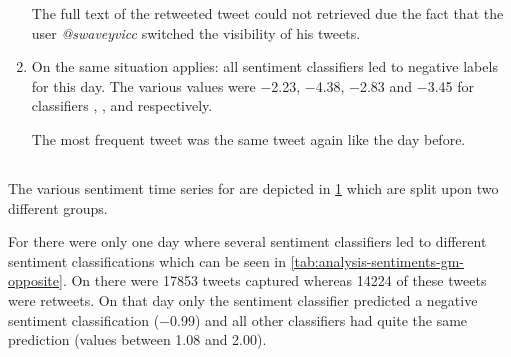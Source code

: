 \begin{enumerate}
        The full text of the retweeted tweet could not retrieved due the fact that the user \emph{@swaveyvicc} switched the visibility of his tweets.

    \item 
        On  the same situation applies: all sentiment classifiers led to negative labels for this day.
        The various values were \num{-2.23}, \num{-4.38}, \num{-2.83} and \num{-3.45} for classifiers \ftb{}, \fnb{}, \fme{} and \fsvm{} respectively.


        The most frequent tweet was the same tweet again like the day before.
\end{enumerate}


\subsection{\gm}
\label{ss:analysis-sentiments-gm}

The various sentiment time series for \gm{} are depicted in \cref{fig:analysis-sentiments-gm} which are split upon two different groups.

\begin{figure}[hbt]
    \centering
    
    \caption{\sentimentsCaption{\gm}}
    \label{fig:analysis-sentiments-gm}
\end{figure}


For \gm{} there were only one day where several sentiment classifiers led to different sentiment classifications which can be seen in \cref{tab:analysis-sentiments-gm-opposite}.
On  there were \num{17853} tweets captured whereas \num{14224} of these tweets were retweets.
On that day only the \nb{} sentiment classifier predicted a negative sentiment classification (\num{-0.99}) and all other classifiers had quite the same prediction (values between \num{1.08} and \num{2.00}).

